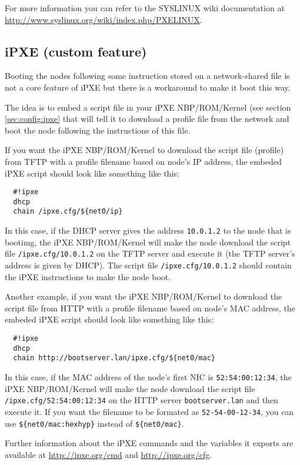 \documentclass[a4paper,11pt]{article}
\begin{document}
For more information you can refer to the SYSLINUX wiki documentation at \url{http://www.syslinux.org/wiki/index.php/PXELINUX}.

\subsection{iPXE (custom feature)}
Booting the nodes following some instruction stored on a network-shared file is not a core feature of iPXE but there is a workaround to make it boot this way.

The idea is to embed a script file in your iPXE NBP/ROM/Kernel (see section \ref{sec:config:ipxe} that will tell it to download a profile file from the network and boot the node following the instructions of this file.

If you want the iPXE NBP/ROM/Kernel to download the script file (profile) from TFTP with a profile filename based on node's IP address, the embeded iPXE script should look like something like this:
\begin{verbatim}
  #!ipxe
  dhcp
  chain /ipxe.cfg/${net0/ip}
\end{verbatim}
In this case, if the DHCP server gives the address \texttt{10.0.1.2} to the node that is bootimg, the iPXE NBP/ROM/Kernel will make the node download the script file \texttt{/ipxe.cfg/10.0.1.2} on the TFTP server and execute it (the TFTP server's address is given by DHCP). The script file \texttt{/ipxe.cfg/10.0.1.2} should contain the iPXE instructions to make the node boot.

Another example, if you want the iPXE NBP/ROM/Kernel to download the script file from HTTP with a profile filename based on node's MAC address, the embeded iPXE script should look like something like this:
\begin{verbatim}
  #!ipxe
  dhcp
  chain http://bootserver.lan/ipxe.cfg/${net0/mac}
\end{verbatim}
In this case, if the MAC address of the node's first NIC is \texttt{52:54:00:12:34}, the iPXE NBP/ROM/Kernel will make the node download the script file \texttt{/ipxe.cfg/52:54:00:12:34} on the HTTP server \texttt{bootserver.lan} and then execute it. If you want the filename to be formated as \texttt{52-54-00-12-34}, you can use \texttt{\$\{net0/mac:hexhyp\}} instead of \texttt{\$\{net0/mac\}}.

Further information about the iPXE commands and the variables it exports are available at \url{http://ipxe.org/cmd} and \url{http://ipxe.org/cfg}.
\end{document}
